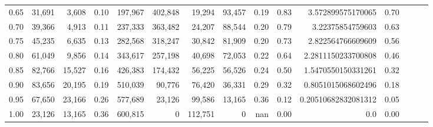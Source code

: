 \begin{tabular}{rrrrrrrrrrrrrrr}
0.65 &  31,691 &   3,608 &  0.10 &  197,967 &  402,848 &   19,294 &   93,457 &  0.19 &  0.83 &    3.572899575170065 &      0.70 \\
0.70 &  39,366 &   4,913 &  0.11 &  237,333 &  363,482 &   24,207 &   88,544 &  0.20 &  0.79 &     3.22375854759603 &      0.63 \\
0.75 &  45,235 &   6,635 &  0.13 &  282,568 &  318,247 &   30,842 &   81,909 &  0.20 &  0.73 &    2.822564766609609 &      0.56 \\
0.80 &  61,049 &   9,856 &  0.14 &  343,617 &  257,198 &   40,698 &   72,053 &  0.22 &  0.64 &   2.2811150233700808 &      0.46 \\
0.85 &  82,766 &  15,527 &  0.16 &  426,383 &  174,432 &   56,225 &   56,526 &  0.24 &  0.50 &   1.5470550150331261 &      0.32 \\
0.90 &  83,656 &  20,195 &  0.19 &  510,039 &   90,776 &   76,420 &   36,331 &  0.29 &  0.32 &   0.8051015068602496 &      0.18 \\
0.95 &  67,650 &  23,166 &  0.26 &  577,689 &   23,126 &   99,586 &   13,165 &  0.36 &  0.12 &  0.20510682832081312 &      0.05 \\
1.00 &  23,126 &  13,165 &  0.36 &  600,815 &        0 &  112,751 &        0 &   nan &  0.00 &                  0.0 &      0.00 \\
\bottomrule
\end{tabular}
